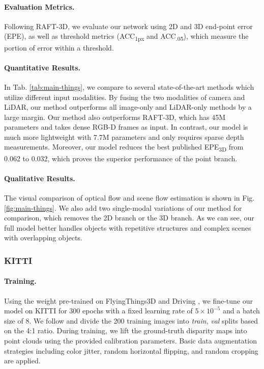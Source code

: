 \documentclass[10pt,twocolumn,letterpaper]{article}
\begin{document}
\paragraph{Evaluation Metrics.} Following RAFT-3D, we evaluate our network using 2D and 3D end-point error (EPE), as well as threshold metrics (ACC\textsubscript{1px} and ACC\textsubscript{.05}), which measure the portion of error within a threshold.

\vspace{-10pt}
\paragraph{Quantitative Results.} In Tab. \ref{tab:main-things}, we compare to several state-of-the-art methods which utilize different input modalities. By fusing the two modalities of camera and LiDAR, our method outperforms all image-only and LiDAR-only methods by a large margin. Our method also outperforms RAFT-3D, which has 45M parameters and takes dense RGB-D frames as input. In contrast, our model is much more lightweight with 7.7M parameters and only requires sparse depth measurements. Moreover, our model reduces the best published EPE\textsubscript{3D} from 0.062 to 0.032, which proves the superior performance of the point branch.

\vspace{-10pt}
\paragraph{Qualitative Results.} The visual comparison of optical flow and scene flow estimation is shown in Fig. \ref{fig:main-things}. We also add two single-modal variations of our method for comparison, which removes the 2D branch or the 3D branch. As we can see, our full model better handles objects with repetitive structures and complex scenes with overlapping objects.

\subsubsection{KITTI}

\paragraph{Training.} Using the weight pre-trained on FlyingThings3D and Driving \cite{mayer2016things3d}, we fine-tune our model on KITTI for 300 epochs with a fixed learning rate of $5 \times 10^{-5}$ and a batch size of 8. We follow \cite{yang2021rigidmask, yang2020opticalexp} and divide the 200 training images into \textit{train}, \textit{val} splits based on the 4:1 ratio. During training, we lift the ground-truth disparity maps into point clouds using the provided calibration parameters. Basic data augmentation strategies including color jitter, random horizontal flipping, and random cropping are applied.
\end{document}
